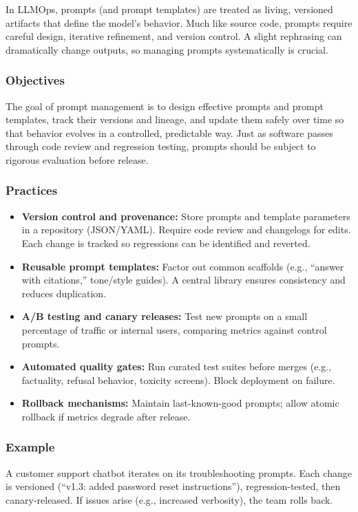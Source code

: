 In LLMOps, prompts (and prompt templates) are treated as living, versioned artifacts that define the model’s behavior. Much like source code, prompts require careful design, iterative refinement, and version control. A slight rephrasing can dramatically change outputs, so managing prompts systematically is crucial.

\subsubsection{Objectives}
The goal of prompt management is to design effective prompts and prompt templates, track their versions and lineage, and update them safely over time so that behavior evolves in a controlled, predictable way. Just as software passes through code review and regression testing, prompts should be subject to rigorous evaluation before release.

\subsubsection{Practices}
\begin{itemize}
    \item \textbf{Version control and provenance:} Store prompts and template parameters in a repository (JSON/YAML). Require code review and changelogs for edits. Each change is tracked so regressions can be identified and reverted.
    \item \textbf{Reusable prompt templates:} Factor out common scaffolds (e.g., ``answer with citations,'' tone/style guides). A central library ensures consistency and reduces duplication.
    \item \textbf{A/B testing and canary releases:} Test new prompts on a small percentage of traffic or internal users, comparing metrics against control prompts.
    \item \textbf{Automated quality gates:} Run curated test suites before merges (e.g., factuality, refusal behavior, toxicity screens). Block deployment on failure.
    \item \textbf{Rollback mechanisms:} Maintain last-known-good prompts; allow atomic rollback if metrics degrade after release.
\end{itemize}

\subsubsection{Example}
A customer support chatbot iterates on its troubleshooting prompts. Each change is versioned (``v1.3: added password reset instructions''), regression-tested, then canary-released. If issues arise (e.g., increased verbosity), the team rolls back.  

